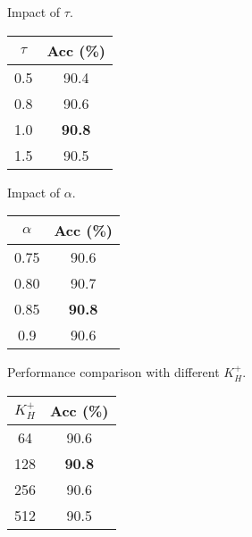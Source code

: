 \documentclass{article} \usepackage{iclr2023_conference,times}
\begin{document}
\begin{minipage}{\textwidth}
\begin{minipage}[t]{0.3\textwidth}
\centering
\setlength\tabcolsep{2pt}
\makeatletter{}
\setlength\tabcolsep{2.5pt}
   \scriptsize
   \caption{Impact of $\tau$.}
    \begin{tabular}{c||c}
\rowcolor{gray!30} $\tau$ & Acc (\%) \\
       \hline \hline
        0.5 & 90.4\\ 
        0.8 & 90.6 \\
        1.0 & \textbf{90.8} \\
        1.5 & 90.5 \\
        \hline
    \end{tabular}
    \label{table:tau}
\end{minipage}
\hspace{2mm}
\begin{minipage}[t]{0.3\textwidth}
\centering
\setlength\tabcolsep{2pt}
\makeatletter{}
\setlength\tabcolsep{2.5pt}
   \scriptsize
   \caption{Impact of $\alpha$.}
    \begin{tabular}{c||c}
\rowcolor{gray!30} $\alpha$ & Acc (\%) \\
       \hline \hline
        0.75 & 90.6\\ 
        0.80 & 90.7 \\
        0.85 & \textbf{90.8} \\
        0.9 & 90.6 \\
        \hline
    \end{tabular}
    \label{table:alpha}
\end{minipage}
\hspace{3mm}
\begin{minipage}[t]{0.3\textwidth}
\centering
\makeatletter{}
\setlength\tabcolsep{2.5pt}
   \scriptsize
   \caption{Performance comparison with different $K_H^+$.}
    \begin{tabular}{c||c}
\rowcolor{gray!30} $K_H^+$ & Acc (\%) \\
       \hline \hline
        64   & 90.6 \\
        128  & \textbf{90.8} \\
        256  & 90.6 \\
        512  & 90.5 \\\hline
    \end{tabular}
    \label{tab:K_H_plus.}
\end{minipage}


\end{minipage}
\end{document}
